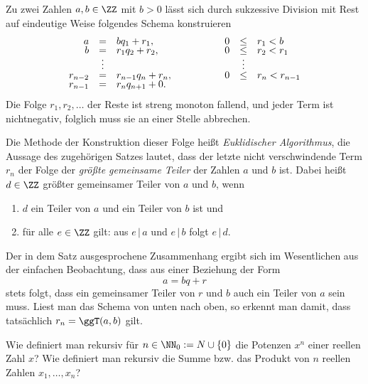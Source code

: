 \begin{antwort}
  Zu zwei Zahlen $a,b\in\ZZ$ mit $b>0$ 
  lässt sich durch sukzessive 
  Division mit Rest  
  auf eindeutige Weise folgendes Schema konstruieren
  \[
  \begin{array}{rclp{12mm}rcl}
    a &=& bq_1+r_1,       & &    0 &\le& r_1 < b\\[-1mm]
    b &=& r_1 q_2 + r_2,  & &    0 &\le& r_2 < r_1 \\[-1mm]
    &\vdots &           & &      &\vdots&        \\[-1mm]
    r_{n-2} &=& r_{n-1}q_n+ r_n, & &  0&\le& r_n < r_{n-1} \\[-1mm]
    r_{n-1} &=& r_n q_{n+1} + 0. & &   &   &             
  \end{array}
  \]
  Die Folge $r_1, r_2, \ldots$ der Reste ist streng monoton 
  fallend, und jeder Term ist nichtnegativ, folglich muss sie 
  an einer Stelle abbrechen. 

  Die Methode der Konstruktion dieser Folge heißt 
  \textit{Euklidischer Algorithmus}, die
  Aussage des zugehörigen Satzes lautet, dass der  
  letzte nicht verschwindende Term $r_n$ der Folge 
  der \textit{größte gemeinsame Teiler} der Zahlen 
  $a$ und $b$ ist. Dabei heißt $d\in\ZZ$ größter gemeinsamer 
  Teiler von $a$ und $b$, wenn
  {\setlength{\labelsep}{4mm}
    \begin{enumerate}
    \item[\desc{i}] $d$ ein Teiler von $a$ und ein Teiler von $b$ ist und\\[-3.5mm]
    \item[\desc{ii}] für alle $e\in\ZZ$ gilt: aus $e \,|\, a$ und $e\,|\,b$ 
      folgt $e\,|\,d$.
    \end{enumerate}}
  Der in dem Satz ausgesprochene 
  Zusammenhang ergibt sich im Wesentlichen aus der einfachen 
  Beobachtung, dass aus einer Beziehung der Form 
  \[
  a = bq+r
  \]
  stets folgt, dass ein gemeinsamer Teiler von $r$ und $b$ auch 
  ein Teiler von $a$ sein muss. 
  Liest man das Schema von unten nach oben, so erkennt man damit,  
  dass tatsächlich $r_n=\ggT(a,b)$ gilt.
  \AntEnd
\end{antwort}






\begin{frage}
  Wie definiert man rekursiv für $n\in\NN_0 := N\cup \{ 0 \}$ 
  die Potenzen $x^n$ einer reellen Zahl $x$? 
  Wie definiert man rekursiv die Summe bzw. das Produkt von $n$ reellen 
  Zahlen $x_1,\ldots, x_n$?
\end{frage}

